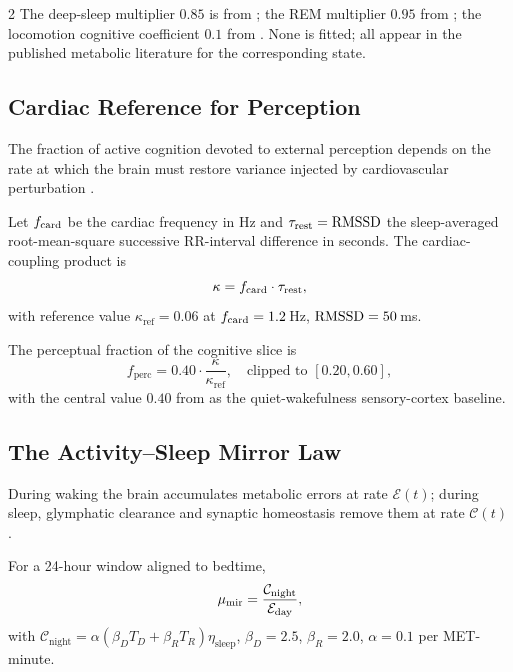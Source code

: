 \begin{multicols}{2}
The deep-sleep multiplier $0.85$ is from \citet{jung2011}; the REM multiplier $0.95$ from \citet{maquet1990,madsen1991}; the locomotion cognitive coefficient $0.1$ from \citet{lutz2004}. None is fitted; all appear in the published metabolic literature for the corresponding state.

\subsection{Cardiac Reference for Perception}

The fraction of active cognition devoted to external perception depends on the rate at which the brain must restore variance injected by cardiovascular perturbation \citep{critchley2005, saper2002}.

\begin{definition}
\label{def:ch08-kappa}
Let $f_{\mathrm{card}}$ be the cardiac frequency in Hz and $\tau_{\mathrm{rest}} = \mathrm{RMSSD}$ the sleep-averaged root-mean-square successive RR-interval difference in seconds. The cardiac-coupling product is
\begin{equation}
\kappa = f_{\mathrm{card}} \cdot \tau_{\mathrm{rest}},
\end{equation}
with reference value $\kappa_{\mathrm{ref}} = 0.06$ at $f_{\mathrm{card}} = 1.2$\,Hz, $\mathrm{RMSSD} = 50$\,ms.
\end{definition}

\begin{definition}
\label{def:ch08-fperc}
The perceptual fraction of the cognitive slice is
\begin{equation}
f_{\mathrm{perc}} = 0.40 \cdot \frac{\kappa}{\kappa_{\mathrm{ref}}},
\quad \text{clipped to } [0.20, 0.60],
\label{eq:ch08-fperc}
\end{equation}
with the central value $0.40$ from \citet{koch2004} as the quiet-wakefulness sensory-cortex baseline.
\end{definition}

\subsection{The Activity--Sleep Mirror Law}

During waking the brain accumulates metabolic errors at rate $\mathcal{E}(t)$; during sleep, glymphatic clearance and synaptic homeostasis remove them at rate $\mathcal{C}(t)$ \citep{xie2013, hablitz2020, tononi2014}.

\begin{definition}
\label{def:ch08-mu}
For a 24-hour window aligned to bedtime,
\begin{equation}
\mu_{\mathrm{mir}} = \frac{\mathcal{C}_{\mathrm{night}}}{\mathcal{E}_{\mathrm{day}}},
\end{equation}
with $\mathcal{C}_{\mathrm{night}} = \alpha(\beta_D T_D + \beta_R T_R)\eta_{\mathrm{sleep}}$, $\beta_D = 2.5$, $\beta_R = 2.0$, $\alpha = 0.1$ per MET-minute.
\end{definition}


\end{multicols}
